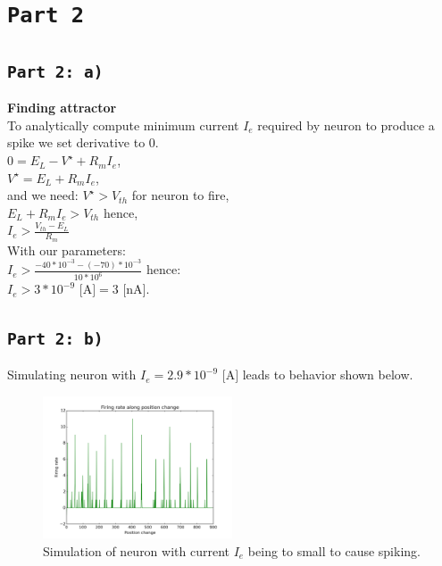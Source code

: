 \documentclass[12pt,a4paper,twocolumn]{article}
\begin{document}
\section*{\texttt{Part 2}}
\subsection*{\texttt{Part 2: a)}}
\textbf{\large Finding attractor}\\
To analytically compute minimum current $I_e$ required by neuron to produce a spike we set derivative to 0.\\
$0=E_L-V^{\star} +R_mI_e$,\\
$V^{\star} = E_L + R_mI_e$,\\
and we need: $V^{\star} > V_{th}$ for neuron to fire,\\
$E_L+R_mI_e > V_{th}$ hence,\\
$I_e > \frac{V_{th} - E_L}{R_m}$\\
With our parameters:\\
$I_e > \frac{-40*10^{-3} - (-70)*10^{-3}}{10*10^6}$ hence:\\
$I_e > 3 * 10^{-9}  \text{ [A]} = 3  \text{ [nA]}$.\\

\subsection*{\texttt{Part 2: b)}}
Simulating neuron with $I_e = 2.9 * 10^{-9}  \text{ [A]}$ leads to behavior shown below.\\

\begin{figure}[htbp]
\centering
\includegraphics[width=0.5\textwidth]{figure2.png}
\caption{Simulation of neuron with current $I_e$ being to small to cause spiking.\label{fig:part2b}}
\vspace{0.2cm}
\end{figure}
\end{document}
